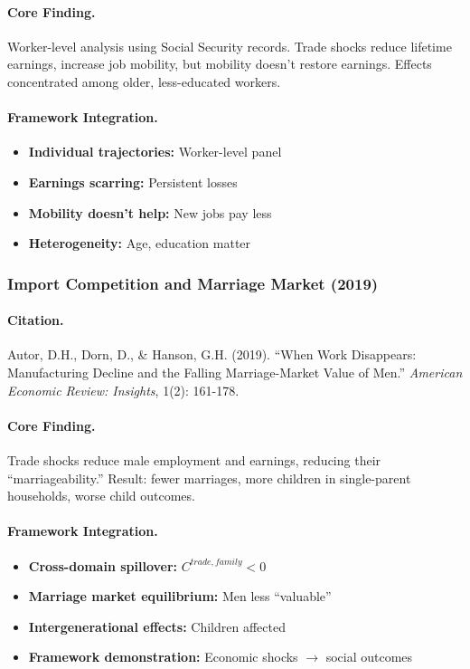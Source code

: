 \paragraph{Core Finding.}
Worker-level analysis using Social Security records. Trade shocks reduce
lifetime earnings, increase job mobility, but mobility doesn't restore
earnings. Effects concentrated among older, less-educated workers.

\paragraph{Framework Integration.}
\begin{itemize}
  \item \textbf{Individual trajectories:} Worker-level panel
  \item \textbf{Earnings scarring:} Persistent losses
  \item \textbf{Mobility doesn't help:} New jobs pay less
  \item \textbf{Heterogeneity:} Age, education matter
\end{itemize}

\subsubsection{Import Competition and Marriage Market (2019)}

\paragraph{Citation.}
Autor, D.H., Dorn, D., \& Hanson, G.H. (2019). ``When Work Disappears:
Manufacturing Decline and the Falling Marriage-Market Value of Men.''
\emph{American Economic Review: Insights}, 1(2): 161-178.

\paragraph{Core Finding.}
Trade shocks reduce male employment and earnings, reducing their
``marriageability.'' Result: fewer marriages, more children in
single-parent households, worse child outcomes.

\paragraph{Framework Integration.}
\begin{itemize}
  \item \textbf{Cross-domain spillover:} $C^{trade,family} < 0$
  \item \textbf{Marriage market equilibrium:} Men less ``valuable''
  \item \textbf{Intergenerational effects:} Children affected
  \item \textbf{Framework demonstration:} Economic shocks $\to$ social outcomes
\end{itemize}

